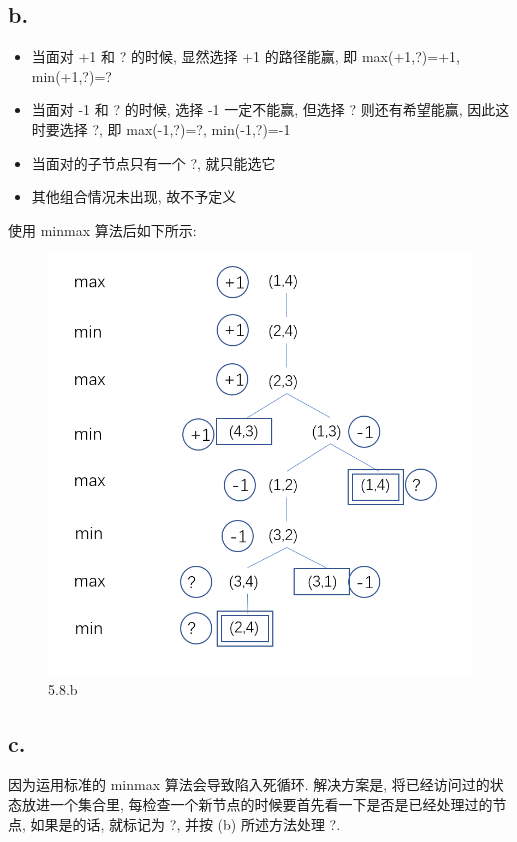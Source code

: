 \documentclass[UTF8]{article}
\begin{document}
\subsection*{b.}
\begin{itemize}
	\item 当面对 +1 和 ? 的时候, 显然选择 +1 的路径能赢, 即 max(+1,?)=+1, min(+1,?)=?
	\item 当面对 -1 和 ? 的时候, 选择 -1 一定不能赢, 但选择 ? 则还有希望能赢, 因此这时要选择 ?, 即 max(-1,?)=?, min(-1,?)=-1
	\item 当面对的子节点只有一个 ?, 就只能选它
	\item 其他组合情况未出现, 故不予定义
\end{itemize}
使用 minmax 算法后如下所示:
\begin{figure}[H]
	\centering
	\includegraphics[width=\linewidth/2]{image/5.8.b.png}
	\caption{5.8.b}
\end{figure}\par
\subsection*{c.}
因为运用标准的 minmax 算法会导致陷入死循环. 解决方案是, 将已经访问过的状态放进一个集合里, 每检查一个新节点的时候要首先看一下是否是已经处理过的节点, 如果是的话, 就标记为 ?, 并按 (b) 所述方法处理 ?.
\end{document}
